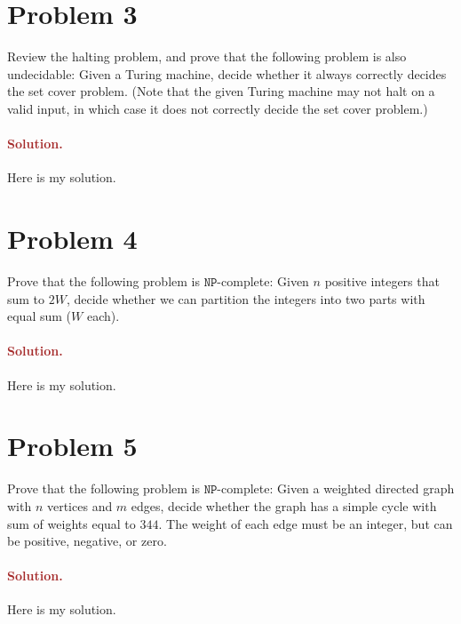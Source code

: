 \section*{Problem 3}
Review the halting problem, and prove that the following problem is also undecidable: Given a Turing machine, decide whether it always correctly decides the set cover problem. (Note that the given Turing machine may not halt on a valid input, in which case it does not correctly decide the set cover problem.)

\paragraph{\textcolor{brown}{Solution.}}
Here is my solution.


\section*{Problem 4}
Prove that the following problem is $\mathtt{NP}$-complete: Given $n$ positive integers that sum to $2W$, decide whether we can partition the integers into two parts with equal sum ($W$ each).

\paragraph{\textcolor{brown}{Solution.}}
Here is my solution.


\section*{Problem 5}
Prove that the following problem is $\mathtt{NP}$-complete: Given a weighted directed graph with $n$ vertices and $m$ edges, decide whether the graph has a simple cycle with sum of weights equal to $344$. The weight of each edge must be an integer, but can be positive, negative, or zero.

\paragraph{\textcolor{brown}{Solution.}}
Here is my solution.
